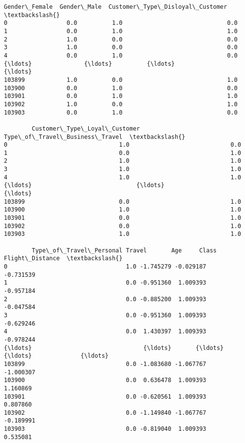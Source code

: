 \documentclass[11pt]{article}
\makeatletter
\newcommand{\boxspacing}{\kern\kvtcb@left@rule\kern\kvtcb@boxsep}
\newcommand{\prompt}[4]{
        {\ttfamily\llap{{\color{#2}[#3]:\hspace{3pt}#4}}\vspace{-\baselineskip}}
    }
\makeatother
\begin{document}
            \begin{tcolorbox}[breakable, size=fbox, boxrule=.5pt, pad at break*=1mm, opacityfill=0]
\prompt{Out}{outcolor}{19}{\boxspacing}
\begin{Verbatim}[commandchars=\\\{\}]
        Gender\_Female  Gender\_Male  Customer\_Type\_Disloyal\_Customer  \textbackslash{}
0                 0.0          1.0                              0.0
1                 0.0          1.0                              1.0
2                 1.0          0.0                              0.0
3                 1.0          0.0                              0.0
4                 0.0          1.0                              0.0
{\ldots}               {\ldots}          {\ldots}                              {\ldots}
103899            1.0          0.0                              1.0
103900            0.0          1.0                              0.0
103901            0.0          1.0                              1.0
103902            1.0          0.0                              1.0
103903            0.0          1.0                              0.0

        Customer\_Type\_Loyal\_Customer  Type\_of\_Travel\_Business\_Travel  \textbackslash{}
0                                1.0                             0.0
1                                0.0                             1.0
2                                1.0                             1.0
3                                1.0                             1.0
4                                1.0                             1.0
{\ldots}                              {\ldots}                             {\ldots}
103899                           0.0                             1.0
103900                           1.0                             1.0
103901                           0.0                             1.0
103902                           0.0                             1.0
103903                           1.0                             1.0

        Type\_of\_Travel\_Personal Travel       Age     Class  Flight\_Distance  \textbackslash{}
0                                  1.0 -1.745279 -0.029187        -0.731539
1                                  0.0 -0.951360  1.009393        -0.957184
2                                  0.0 -0.885200  1.009393        -0.047584
3                                  0.0 -0.951360  1.009393        -0.629246
4                                  0.0  1.430397  1.009393        -0.978244
{\ldots}                                {\ldots}       {\ldots}       {\ldots}              {\ldots}
103899                             0.0 -1.083680 -1.067767        -1.000307
103900                             0.0  0.636478  1.009393         1.160869
103901                             0.0 -0.620561  1.009393         0.807860
103902                             0.0 -1.149840 -1.067767        -0.189991
103903                             0.0 -0.819040  1.009393         0.535081


\end{Verbatim}
\end{tcolorbox}
\end{document}
